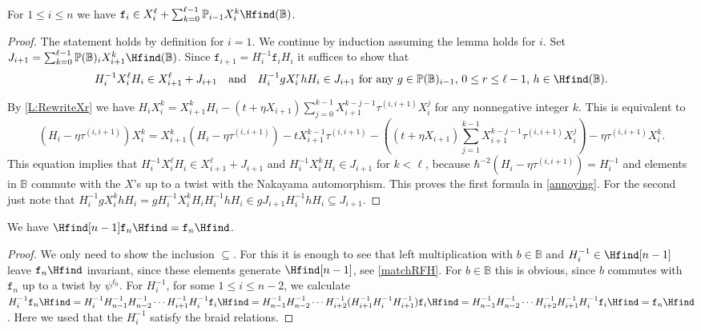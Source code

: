\documentclass[a4paper,11pt]{amsart}
\numberwithin{equation}{subsection}
\theoremstyle{definition}
\theoremstyle{theorem}
\theoremstyle{remark}
\newcommand\Po{\mathbb{P}(\mathbb{B})}
\newcommand\Poo{\mathbb{P}}
\newcommand{\Bo}{\mathbb{B}}
\begin{document}
  \begin{Lemma}\label{fis}
For $1\leq i\leq n$ we have $\mathtt{f}_i\in X_i^\ell+\sum_{k=0}^{\ell-1}\Poo_{i-1}X_i^k\Hfind(\Bo)$.
\end{Lemma}
\begin{proof}The statement holds by definition for $i=1$. We continue by induction assuming the lemma holds for $i$.  Set $J_{i+1}=\sum_{k=0}^{\ell-1}\Po_{i}X_{i+1}^k\Hfind(\Bo)$.
Since $\mathtt{f}_{i+1}=H_i^{-1}\mathtt{f}_iH_i$ it suffices to show that
\begin{equation}\label{annoying}
H_i^{-1}X_i^\ell H_i\in X_{i+1}^\ell+J_{i+1}\quad\text{and}\quad H_i^{-1}gX_{i}^r h H_i\in J_{i+1}\text{ for any $g\in \Po_{i-1}$, $0\leq r\leq \ell-1$, $h\in \Hfind(\Bo)$}.
\end{equation}

By  \autoref{L:RewriteXr} we have
 $H_iX_i^k=X_{i+1}^kH_i - (t+\eta X_{i+1})\sum_{j=0}^{k-1}X_{i+1}^{k-j-1}\tau^{(i,i+1)}X_i^j$ for any nonnegative integer $k$. This is equivalent to
  \begin{equation*}
  (H_i-\eta \tau^{(i,i+1)}) X_i^k=X_{i+1}^k(H_i-\eta \tau^{(i,i+1)}) - tX_{i+1}^{k-1} \tau^{(i,i+1)}-  \left(( t+\eta X_{i+1})\sum_{j=1}^{k-1}X_{i+1}^{k-j-1}\tau^{(i,i+1)}X_i^j\right)-\eta \tau^{(i,i+1)}  X_i^k.
  \end{equation*}
This equation implies that $H_i^{-1}X_i^\ell H_i\in X_{i+1}^\ell+J_{i+1}$ and $H_i^{-1}X_i^k H_i\in J_{i+1}$ for $k< \ell$,
  because  $\hbar^{-2}(H_i-\eta \tau^{(i,i+1)})=H_i^{-1}$ and  elements in $\Bo$ commute with the $X$'s up to a twist with the Nakayama automorphism. This proves the first formula in \autoref{annoying}. For the second just note that
  $H_i^{-1}gX_i^k hH_i=gH_i^{-1}X_i^kH_iH_i^{-1}hH_i\in gJ_{i+1}H_i^{-1}hH_i\subseteq J_{i+1}.$
 \end{proof}
   \begin{Lemma}\label{HfnH}
 We have $\Hfind[n-1] \mathtt{f}_{n}\Hfind = \mathtt{f}_{n}\Hfind$.
 \end{Lemma}
 \begin{proof}
 We only need to show the inclusion $\subseteq$. For this it is enough to see that left multiplication with $b\in\Bo$ and $H_i^{-1}\in\Hfind[n-1]$ leave $\mathtt{f}_{n}\Hfind $ invariant, since these elements generate $\Hfind[n-1]$, see \autoref{matchRFH}.  For $b\in\Bo$ this is obvious, since $b$ commutes with $\mathtt{f}_n$ up to a twist by $\psi^{\ell_0}$.  For $H_i^{-1}$, for some $1\leq i\leq n-2$, we calculate $H_i^{-1} \mathtt{f}_n\Hfind =H_i^{-1}H_{n-1}^{-1}H_{n-2}^{-1}\cdots H_{i+1}^{-1}H_{i}^{-1}\mathtt{f}_i \Hfind=H_{n-1}^{-1}H_{n-2}^{-1}\cdots H_{i+2}^{-1}(H_{i+1}^{-1}H_{i}^{-1}H_{i+1}^{-1})\mathtt{f}_i \Hfind=H_{n-1}^{-1}H_{n-2}^{-1}\cdots H_{i+2}^{-1}H_{i+1}^{-1}H_{i}^{-1}\mathtt{f}_i \Hfind=\mathtt{f}_n\Hfind$. Here we used that the $H_i^{-1}$ satisfy the braid relations.
  \end{proof}
\end{document}
